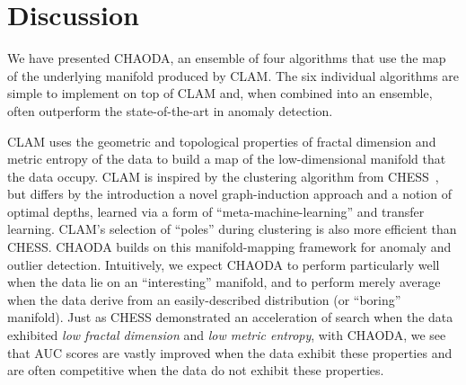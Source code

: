 \section{Discussion}
\label{sec:discussion}

We have presented CHAODA, an ensemble of four algorithms that use the map of the underlying manifold produced by CLAM\@.
The six individual algorithms are simple to implement on top of CLAM and, when combined into an ensemble, often outperform the state-of-the-art in anomaly detection.

CLAM uses the geometric and topological properties of fractal dimension and metric entropy of the data to build a map of the low-dimensional manifold that the data occupy.
CLAM is inspired by the clustering algorithm from CHESS~\cite{ishaq2019clustered}, but differs by the introduction a novel graph-induction approach and a notion of optimal depths, learned via a form of ``meta-machine-learning'' and transfer learning.
CLAM's selection of ``poles'' during clustering is also more efficient than CHESS.
CHAODA builds on this manifold-mapping framework for anomaly and outlier detection.
Intuitively, we expect CHAODA to perform particularly well when the data lie on an ``interesting'' manifold, and to perform merely average when the data derive from an easily-described distribution (or ``boring'' manifold).
Just as CHESS demonstrated an acceleration of search when the data exhibited \emph{low fractal dimension} and \emph{low metric entropy}, with CHAODA, we see that AUC scores are vastly improved when the data exhibit these properties and are often competitive when the data do not exhibit these properties.




